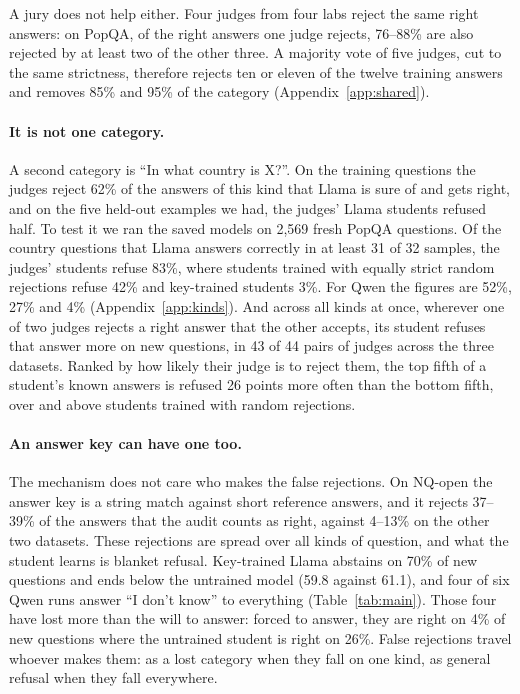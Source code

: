 \documentclass[11pt,a4paper,twocolumn]{article}
\newcommand{\idk}{``I don't know''}
\begin{document}
A jury does not help either. Four judges from four labs reject the same right answers: on PopQA, of the right answers one judge rejects, 76--88\% are also rejected by at least two of the other three. A majority vote of five judges, cut to the same strictness, therefore rejects ten or eleven of the twelve training answers and removes 85\% and 95\% of the category (Appendix~\ref{app:shared}).

\paragraph{It is not one category.} A second category is ``In what country is X?''. On the training questions the judges reject 62\% of the answers of this kind that Llama is sure of and gets right, and on the five held-out examples we had, the judges' Llama students refused half. To test it we ran the saved models on 2{,}569 fresh PopQA questions. Of the country questions that Llama answers correctly in at least 31 of 32 samples, the judges' students refuse 83\%, where students trained with equally strict random rejections refuse 42\% and key-trained students 3\%. For Qwen the figures are 52\%, 27\% and 4\% (Appendix~\ref{app:kinds}). And across all kinds at once, wherever one of two judges rejects a right answer that the other accepts, its student refuses that answer more on new questions, in 43 of 44 pairs of judges across the three datasets. Ranked by how likely their judge is to reject them, the top fifth of a student's known answers is refused 26 points more often than the bottom fifth, over and above students trained with random rejections.

\paragraph{An answer key can have one too.} The mechanism does not care who makes the false rejections. On NQ-open the answer key is a string match against short reference answers, and it rejects 37--39\% of the answers that the audit counts as right, against 4--13\% on the other two datasets. These rejections are spread over all kinds of question, and what the student learns is blanket refusal. Key-trained Llama abstains on 70\% of new questions and ends below the untrained model (59.8 against 61.1), and four of six Qwen runs answer \idk{} to everything (Table~\ref{tab:main}). Those four have lost more than the will to answer: forced to answer, they are right on 4\% of new questions where the untrained student is right on 26\%. False rejections travel whoever makes them: as a lost category when they fall on one kind, as general refusal when they fall everywhere.
\end{document}
